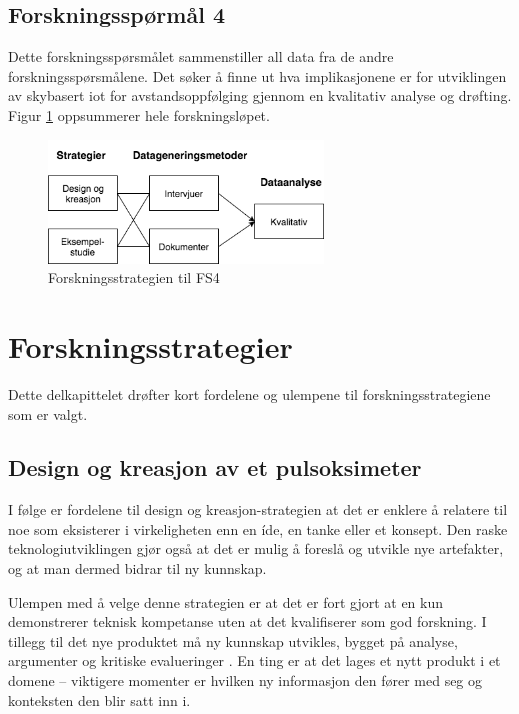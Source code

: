 \subsection{Forskningsspørmål 4}
\textbf{}

Dette forskningsspørsmålet sammenstiller all data fra de andre forskningsspørsmålene. Det søker å finne ut hva implikasjonene
er for utviklingen av skybasert \gls{iot} for avstandsoppfølging gjennom en kvalitativ analyse og drøfting.
Figur \ref{fig:oates_fs4} oppsummerer hele forskningsløpet.

\begin{figure}
\centering
\includegraphics[width=0.65\textwidth]{fig/oates/fs4}
\caption{Forskningsstrategien til FS4}
\label{fig:oates_fs4}
\end{figure}

\section{Forskningsstrategier}
\label{sec:forskningsstrategier}
Dette delkapittelet drøfter kort fordelene og ulempene til forskningsstrategiene som er valgt.

\subsection{Design og kreasjon av et pulsoksimeter}
I følge \citet[s.121-122]{oates} er fordelene til design og kreasjon-strategien at det er enklere å relatere til noe
som eksisterer i virkeligheten enn en íde, en tanke eller et konsept.
Den raske teknologiutviklingen gjør også at det er mulig å foreslå og utvikle nye artefakter, og at man dermed bidrar til ny kunnskap.

Ulempen med å velge denne strategien er at det er fort gjort at en kun demonstrerer
teknisk kompetanse uten at det kvalifiserer som god forskning. I tillegg til det nye produktet må ny kunnskap utvikles, bygget
på analyse, argumenter og kritiske evalueringer \citep[s. 109]{oates}. En ting er at det lages et nytt produkt i et domene --
viktigere momenter er hvilken ny informasjon den fører med seg og konteksten den blir satt inn i.


